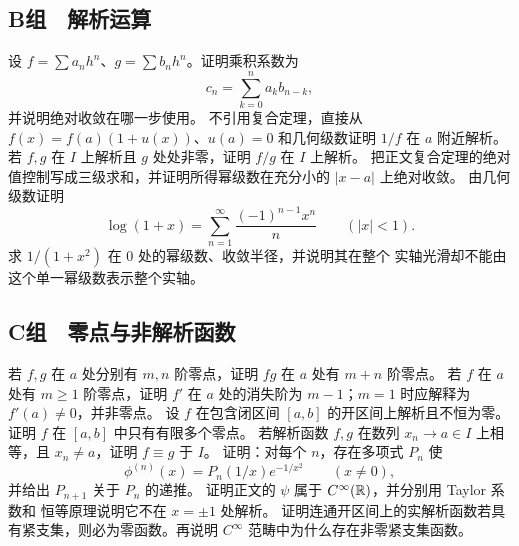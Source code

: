 \subsection*{B组　解析运算}
\begin{enumerate}[label=\textbf{\thechapter.\arabic*.},resume]
 设 \(f=\sum a_nh^n\)、\(g=\sum b_nh^n\)。证明乘积系数为
 \[
  c_n=\sum_{k=0}^na_kb_{n-k},
 \]
 并说明绝对收敛在哪一步使用。
 不引用复合定理，直接从
 \(f(x)=f(a)(1+u(x))\)、\(u(a)=0\) 和几何级数证明 \(1/f\) 在
 \(a\) 附近解析。
 若 \(f,g\) 在 \(I\) 上解析且 \(g\) 处处非零，证明 \(f/g\) 在
 \(I\) 上解析。
 把正文复合定理的绝对值控制写成三级求和，并证明所得幂级数在充分小的
 \(|x-a|\) 上绝对收敛。
 由几何级数证明
 \[
  \log(1+x)=\sum_{n=1}^\infty\frac{(-1)^{n-1}x^n}{n}
  \qquad(|x|<1).
 \]
 求 \(1/(1+x^2)\) 在 \(0\) 处的幂级数、收敛半径，并说明其在整个
 实轴光滑却不能由这个单一幂级数表示整个实轴。
\end{enumerate}

\subsection*{C组　零点与非解析函数}
\begin{enumerate}[label=\textbf{\thechapter.\arabic*.},resume]
 若 \(f,g\) 在 \(a\) 处分别有 \(m,n\) 阶零点，证明 \(fg\) 在
 \(a\) 处有 \(m+n\) 阶零点。
 若 \(f\) 在 \(a\) 处有 \(m\ge1\) 阶零点，证明 \(f'\) 在 \(a\)
 处的消失阶为 \(m-1\)；\(m=1\) 时应解释为 \(f'(a)\ne0\)，并非零点。
 设 \(f\) 在包含闭区间 \([a,b]\) 的开区间上解析且不恒为零。证明
 \(f\) 在 \([a,b]\) 中只有有限多个零点。
 若解析函数 \(f,g\) 在数列 \(x_n\to a\in I\) 上相等，且
 \(x_n\ne a\)，证明 \(f\equiv g\) 于 \(I\)。
 证明：对每个 \(n\)，存在多项式 \(P_n\) 使
 \[
  \phi^{(n)}(x)=P_n(1/x)e^{-1/x^2}\qquad(x\ne0),
 \]
 并给出 \(P_{n+1}\) 关于 \(P_n\) 的递推。
 证明正文的 \(\psi\) 属于 \(C^\infty(\mathbb{R})\)，并分别用 Taylor 系数和
 恒等原理说明它不在 \(x=\pm1\) 处解析。
 证明连通开区间上的实解析函数若具有紧支集，则必为零函数。再说明
 \(C^\infty\) 范畴中为什么存在非零紧支集函数。
\end{enumerate}
